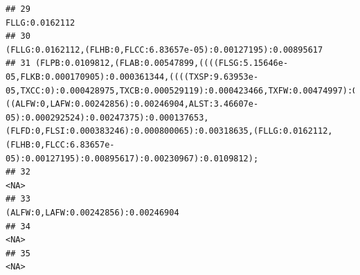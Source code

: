 \documentclass[]{article}
\begin{document}
\begin{verbatim}
## 29                                                                                                                                                                                                                                                                                                                                                                                                                 FLLG:0.0162112
## 30                                                                                                                                                                                                                                                                                                                                                               (FLLG:0.0162112,(FLHB:0,FLCC:6.83657e-05):0.00127195):0.00895617
## 31 (FLPB:0.0109812,(FLAB:0.00547899,((((FLSG:5.15646e-05,FLKB:0.000170905):0.000361344,((((TXSP:9.63953e-05,TXCC:0):0.000428975,TXCB:0.000529119):0.000423466,TXFW:0.00474997):0.00280452,((ALFW:0,LAFW:0.00242856):0.00246904,ALST:3.46607e-05):0.000292524):0.00247375):0.000137653,(FLFD:0,FLSI:0.000383246):0.000800065):0.00318635,(FLLG:0.0162112,(FLHB:0,FLCC:6.83657e-05):0.00127195):0.00895617):0.00230967):0.0109812);
## 32                                                                                                                                                                                                                                                                                                                                                                                                                           <NA>
## 33                                                                                                                                                                                                                                                                                                                                                                                            (ALFW:0,LAFW:0.00242856):0.00246904
## 34                                                                                                                                                                                                                                                                                                                                                                                                                           <NA>
## 35                                                                                                                                                                                                                                                                                                                                                                                                                           <NA>

\end{verbatim}
\end{document}
